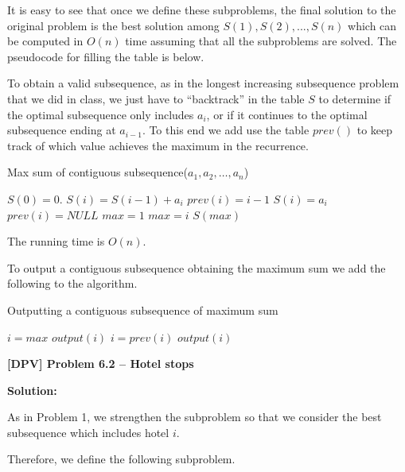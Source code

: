\documentclass[12pt]{article}
\begin{document}
It is easy to see that once we define these subproblems, the final solution to the original problem is the best solution among $S(1), S(2),..., S(n)$ which can be computed in $O(n)$ time assuming that all the subproblems are solved.
The pseudocode for filling the table is below.

To obtain a valid subsequence, as in the longest increasing subsequence problem
that we did in class, we just have to ``backtrack'' in the table $S$ to determine if the
optimal subsequence only includes $a_i$, or if it continues to the optimal subsequence ending at $a_{i-1}$.
To this end we add use the table $prev()$ to keep track of which value achieves
the maximum in the recurrence.

\begin{algorithm}[h!]
\caption{Max sum of contiguous subsequence($a_1,a_2,\dots,a_n$)}
\begin{algorithmic}
\STATE $S(0) = 0$.
\STATE $S(i) = S(i-1)+a_i$
\STATE $prev(i) = i-1$
\ELSE
\STATE $S(i) = a_i$
\STATE $prev(i) = NULL$
\ENDIF
\ENDFOR
\STATE $max=1$
\STATE $max=i$
\ENDIF
\ENDFOR
\RETURN $S(max)$
\end{algorithmic}
\end{algorithm}


The running time is $O(n)$.

To output a contiguous subsequence obtaining the maximum sum we add
the following to the algorithm.

\begin{algorithm}[h!]
\caption{Outputting a contiguous subsequence of maximum sum}
\begin{algorithmic}
\STATE $i=max$
\STATE $output(i)$
\STATE $i = prev(i)$
\STATE  $output(i)$
  \ENDWHILE
\end{algorithmic}
\end{algorithm}






\newpage

{\noindent \bf [DPV] Problem 6.2 --  Hotel stops}

 {\noindent \bf Solution:}

As in Problem 1, we strengthen the subproblem so that we consider
 the best subsequence which includes hotel $i$.

 Therefore, we define the following subproblem.  
\end{document}
